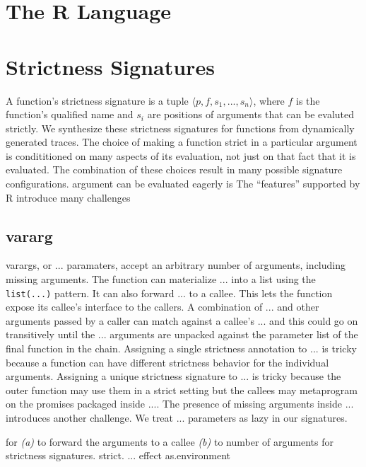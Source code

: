 \documentclass[screen,acmsmall]{acmart}
\newcommand{\code}[1]{\lstinline[style=R]|#1|\xspace}
\begin{document}
\section{The R Language}


\section{Strictness Signatures}

A function's strictness signature is a tuple $\langle p, f, s_1, ..., s_n
\rangle$, where $f$ is the function's qualified name and $s_i$ are positions of
arguments that can be evaluted strictly. We synthesize these strictness
signatures for functions from dynamically generated traces. The choice of making
a function strict in a particular argument is condititioned on many aspects of
its evaluation, not just on that fact that it is evaluated. The combination of
these choices result in many possible signature configurations.
argument can be evaluated eagerly is The ``features'' supported by R introduce
many challenges

\subsection{vararg}
varargs, or $...$ paramaters, accept an arbitrary number of arguments, including
missing arguments. The function can materialize $...$ into a list using the
\code{list(...)} pattern. It can also forward $...$ to a callee. This lets the
function expose its callee's interface to the callers. A combination of $...$
and other arguments passed by a caller can match against a callee's $...$ and
this could go on transitively until the $...$ arguments are unpacked against the
parameter list of the final function in the chain. Assigning a single strictness
annotation to $...$ is tricky because a function can have different
strictness behavior for the individual arguments. Assigning a unique strictness
signature to $...$ is tricky because the outer function may use them in a strict
setting but the callees may metaprogram on the promises packaged inside $...$.
The presence of missing arguments inside $...$ introduces another challenge.
We treat $...$ parameters as lazy in our signatures.


 


for
\emph{(a)} to forward the arguments to a callee \emph{(b)} to number of
arguments for strictness signatures. strict. ... effect as.environment
\end{document}
